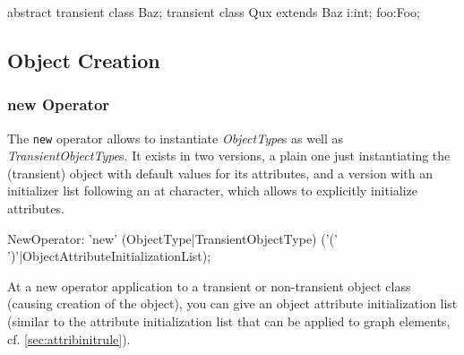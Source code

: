 

\begin{example}
\begin{grgen}
abstract transient class Baz;
transient class Qux extends Baz {
  i:int;
  foo:Foo;
}
\end{grgen}
\end{example}


\subsection{Object Creation}

\subsubsection{new Operator}\label{subsec:copynclonefunctions}

The \texttt{new} operator allows to instantiate \emph{ObjectType}s as well as \emph{TransientObjectType}s.
It exists in two versions, a plain one just instantiating the (transient) object with default values for its attributes, and a version with an initializer list following an at character, which allows to explicitly initialize attributes.

\begin{rail}
  NewOperator: 'new' (ObjectType|TransientObjectType) ('(' ')'|ObjectAttributeInitializationList);
\end{rail}


At a new operator application to a transient or non-transient object class (causing creation of the object), you can give an object attribute initialization list (similar to the attribute initialization list that can be applied to graph elements, cf. \ref{sec:attribinitrule}).

